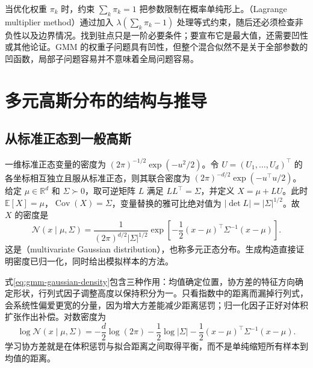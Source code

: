 \documentclass[UTF8]{ctexart}
\begin{document}
当优化权重 $\pi_k$ 时，约束 $\sum_k\pi_k=1$ 把参数限制在概率单纯形上。（Lagrange multiplier method）通过加入 $\lambda(\sum_k\pi_k-1)$ 处理等式约束，随后还必须检查非负性以及边界情况。找到驻点只是一阶必要条件；要宣布它是最大值，还需要凹性或其他论证。GMM 的权重子问题具有凹性，但整个混合似然不是关于全部参数的凹函数，局部子问题容易并不意味着全局问题容易。

\section{多元高斯分布的结构与推导}
\label{sec:gmm-gaussian}

\subsection{从标准正态到一般高斯}
一维标准正态变量的密度为 $(2\pi)^{-1/2}\exp(-u^2/2)$。令 $U=(U_1,\ldots,U_d)^\top$ 的各坐标相互独立且服从标准正态，则其联合密度为 $(2\pi)^{-d/2}\exp(-u^\top u/2)$。给定 $\mu\in\mathbb R^d$ 和 $\Sigma\succ0$，取可逆矩阵 $L$ 满足 $LL^\top=\Sigma$，并定义 $X=\mu+LU$。此时 $\mathbb E[X]=\mu$，$\operatorname{Cov}(X)=\Sigma$，变量替换的雅可比绝对值为 $|\det L|=|\Sigma|^{1/2}$。故 $X$ 的密度是
\begin{equation}
\mathcal N(x\mid\mu,\Sigma)=\frac{1}{(2\pi)^{d/2}|\Sigma|^{1/2}}
\exp\!\left[-\frac12(x-\mu)^\top\Sigma^{-1}(x-\mu)\right].
\label{eq:gmm-gaussian-density}
\end{equation}
这是（multivariate Gaussian distribution），也称多元正态分布。生成构造直接证明密度已归一化，同时给出模拟样本的方法。

式\eqref{eq:gmm-gaussian-density}包含三种作用：均值确定位置，协方差的特征方向确定形状，行列式因子调整高度以保持积分为一。只看指数中的距离而漏掉行列式，会系统性偏爱更宽的分量，因为增大方差能减少距离惩罚；归一化因子正好对体积扩张作出补偿。对数密度为
\begin{equation}
\log\mathcal N(x\mid\mu,\Sigma)=-\frac d2\log(2\pi)-\frac12\log|\Sigma|
-\frac12(x-\mu)^\top\Sigma^{-1}(x-\mu).
\label{eq:gmm-log-gaussian}
\end{equation}
学习协方差就是在体积惩罚与拟合距离之间取得平衡，而不是单纯缩短所有样本到均值的距离。
\end{document}
